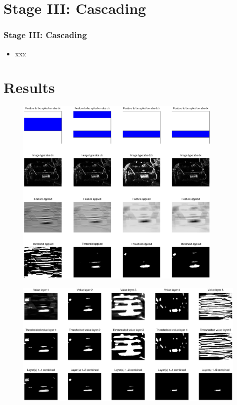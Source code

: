 \documentclass{beamer}
\begin{document}
\section{Stage III: Cascading}
\frame
{
  \frametitle{Stage III: Cascading}
	
  \begin{itemize}
  \item <+-| alert@+> xxx
  \end{itemize}
}

\section{Results}
\frame
{
	\begin{figure}[!ht]
	\centering
	\includegraphics[width=10cm]{../report/img/strongClassifier_layer2_img14}
	\label{fig:strongclassify}
	\end{figure}
}


\frame
{
	\begin{figure}[!ht]
	\centering
	\includegraphics[width=12cm]{../report/img/cascader_img14}
	\label{fig:cascader}
	\end{figure}
}
\end{document}
